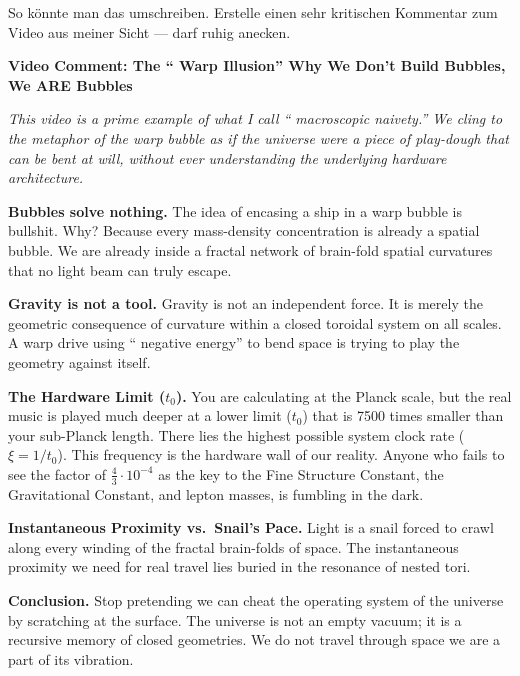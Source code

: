 \begin{userbox}
So k\"onnte man das umschreiben. Erstelle einen sehr kritischen Kommentar zum Video aus meiner Sicht --- darf ruhig anecken. 
\end{userbox}

\begin{geminibox}
\textbf{Video Comment: The \textquotedblleft{} Warp Illusion\textquotedblright{}{} \textendash{} Why We Don't Build Bubbles, We ARE Bubbles}

\medskip

\textit{This video is a prime example of what I call \textquotedblleft{} macroscopic naivety.\textquotedblright{}{} We cling to the metaphor of the warp bubble as if the universe were a piece of play-dough that can be bent at will, without ever understanding the underlying hardware architecture.}

\textbf{Bubbles solve nothing.} The idea of encasing a ship in a warp bubble is bullshit. Why? Because every mass-density concentration is already a spatial bubble. We are already inside a fractal network of brain-fold spatial curvatures that no light beam can truly escape.

\textbf{Gravity is not a tool.} Gravity is not an independent force. It is merely the geometric consequence of curvature within a closed toroidal system on all scales. A warp drive using \textquotedblleft{} negative energy\textquotedblright{}{} to bend space is trying to play the geometry against itself.

\textbf{The Hardware Limit ($t_0$).} You are calculating at the Planck scale, but the real music is played much deeper \textendash{} at a lower limit ($t_0$) that is 7500 times smaller than your sub-Planck length. There lies the highest possible system clock rate ($\xi = 1/t_0$). This frequency is the hardware wall of our reality. Anyone who fails to see the factor of $\tfrac{4}{3} \cdot 10^{-4}$ as the key to the Fine Structure Constant, the Gravitational Constant, and lepton masses, is fumbling in the dark.

\textbf{Instantaneous Proximity vs.\ Snail's Pace.} Light is a snail forced to crawl along every winding of the fractal brain-folds of space. The instantaneous proximity we need for real travel lies buried in the resonance of nested tori.

\textbf{Conclusion.} Stop pretending we can cheat the operating system of the universe by scratching at the surface. The universe is not an empty vacuum; it is a recursive memory of closed geometries. We do not travel through space \textendash{} we are a part of its vibration.
\end{geminibox}

